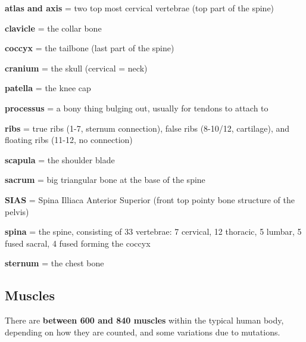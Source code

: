\begin{itemize*}
    \item \textbf{atlas and axis} = two top most cervical vertebrae (top part of the spine)
    \item \textbf{clavicle} = the collar bone
    \item \textbf{coccyx} = the tailbone (last part of the spine)
    \item \textbf{cranium} = the skull (cervical = neck)
    \item \textbf{patella} = the knee cap
    \item \textbf{processus} = a bony thing bulging out, usually for tendons to attach to
    \item \textbf{ribs} = true ribs (1-7, sternum connection), false ribs (8-10/12, cartilage), and floating ribs (11-12, no connection)
    \item \textbf{scapula} = the shoulder blade
    \item \textbf{sacrum} = big triangular bone at the base of the spine
    \item \textbf{SIAS} = Spina Illiaca Anterior Superior (front top pointy bone structure of the pelvis)
    \item \textbf{spina} = the spine, consisting of 33 vertebrae: 7 cervical, 12 thoracic, 5 lumbar, 5 fused sacral, 4 fused forming the coccyx
    \item \textbf{sternum} = the chest bone
\end{itemize*}

\subsection{Muscles}\label{subsec:muscles}

There are \textbf{between 600 and 840 muscles} within the typical human body, depending on how they are counted, and some variations due to mutations.

